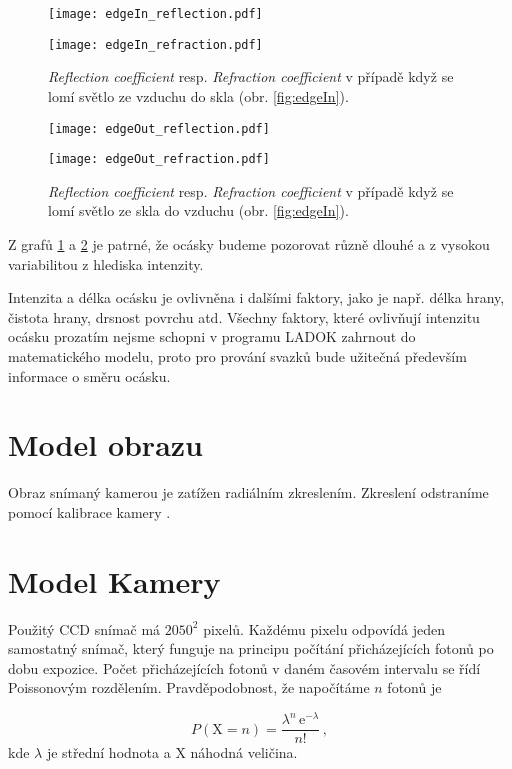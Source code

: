 \begin{figure}[htps]
\centering
\begin{minipage}[c]{0.48\textwidth}
\texttt{[image: edgeIn\_reflection.pdf]}
\end{minipage}
\begin{minipage}[c]{0.48\textwidth}
\texttt{[image: edgeIn\_refraction.pdf]}
\end{minipage}
\caption{\textit{Reflection coefficient} resp. \textit{Refraction coefficient} v případě když se lomí světlo ze vzduchu do skla (obr. \ref{fig:edgeIn}).}
\label{fig:edgeInGraf}
\end{figure}

\begin{figure}[htps]
\centering
\begin{minipage}[c]{0.48\textwidth}
\texttt{[image: edgeOut\_reflection.pdf]}
\end{minipage}
\begin{minipage}[c]{0.48\textwidth}
\texttt{[image: edgeOut\_refraction.pdf]}
\end{minipage}
\caption{\textit{Reflection coefficient} resp. \textit{Refraction coefficient} v případě když se lomí světlo ze skla do vzduchu (obr. \ref{fig:edgeIn}).}
\label{fig:edgeOutGraf}
\end{figure}

Z grafů \ref{fig:edgeInGraf} a \ref{fig:edgeOutGraf} je patrné, že ocásky budeme pozorovat různě dlouhé a z vysokou variabilitou z hlediska intenzity. 
	  

 Intenzita a délka ocásku je ovlivněna i dalšími faktory, jako je např. délka hrany, čistota hrany, drsnost povrchu atd. Všechny faktory, které ovlivňují intenzitu ocásku prozatím nejsme schopni v programu LADOK zahrnout do matematického modelu, proto pro prování svazků bude užitečná především informace o směru ocásku. 
 
 

\section{Model obrazu}

Obraz snímaný kamerou je zatížen radiálním zkreslením. Zkreslení odstraníme pomocí kalibrace kamery \cite{Drapela}. 


\section{Model Kamery}
\label{sec:poisson}
 Použitý CCD snímač má $2050^2$ pixelů. Každému pixelu odpovídá jeden samostatný snímač, který funguje na principu počítání přicházejících fotonů po dobu expozice. Počet přicházejících fotonů v daném časovém intervalu se řídí Poissonovým rozdělením. Pravděpodobnost, že napočítáme $n$ fotonů je 
 
 \begin{equation}
    P(\mathrm{X} = n)=\frac{\lambda ^{n}\,\mathrm{e}^{-\lambda}}{n!}\,,
 \end{equation}
 kde $\lambda$ je střední hodnota a $\mathrm{X}$ náhodná veličina.












